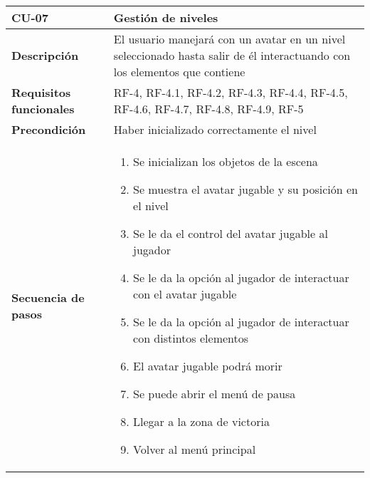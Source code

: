 \begin{tabularx}{\columnwidth}{l|l}
\begin{minipage}{0.25\columnwidth}
\textbf{CU-07} 
\end{minipage}
&
\begin{minipage}{0.65\columnwidth}
Gestión de niveles
\end{minipage}
\\ \hline

\begin{minipage}{0.25\columnwidth}
\textbf{Descripción} 
\end{minipage}
&
\begin{minipage}{0.65\columnwidth}
El usuario manejará con un avatar en un nivel seleccionado hasta salir de él interactuando con los elementos que contiene
\end{minipage}
\\ \hline

\begin{minipage}{0.25\columnwidth}
\textbf{Requisitos funcionales} 
\end{minipage}
&
\begin{minipage}{0.65\columnwidth}
RF-4, RF-4.1, RF-4.2, RF-4.3, RF-4.4, RF-4.5, RF-4.6, RF-4.7, RF-4.8, RF-4.9, RF-5
\end{minipage}
\\ \hline

\begin{minipage}{0.25\columnwidth}
\textbf{Precondición} 
\end{minipage}
&
\begin{minipage}{0.65\columnwidth}
Haber inicializado correctamente el nivel
\end{minipage}
\\ \hline

\begin{minipage}{0.25\columnwidth}
\textbf{Secuencia de pasos} 
\end{minipage}
&
\begin{minipage}{0.65\columnwidth}
\begin{enumerate}
\item
Se inicializan los objetos de la escena
\item
Se muestra el avatar jugable y su posición en el nivel
\item
Se le da el control del avatar jugable al jugador
\item
Se le da la opción al jugador de interactuar con el avatar jugable
\item
Se le da la opción al jugador de interactuar con distintos elementos
\item
El avatar jugable podrá morir
\item
Se puede abrir el menú de pausa
\item
Llegar a la zona de victoria
\item
Volver al menú principal
\end{enumerate}
\end{minipage}
\\ \hline


\end{tabularx}
